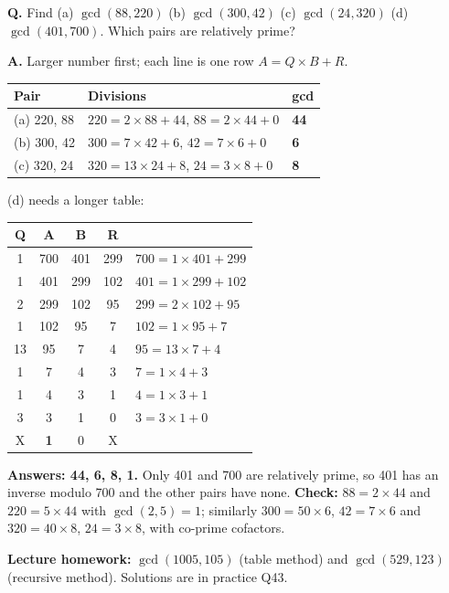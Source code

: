 \begin{worked}
\textbf{Q.} Find (a) $\gcd(88, 220)$ \quad (b) $\gcd(300, 42)$ \quad (c) $\gcd(24, 320)$ \quad (d) $\gcd(401, 700)$. Which pairs are relatively prime?

\textbf{A.} Larger number first; each line is one row $A = Q \times B + R$.
\begin{center}\small
\begin{tabular}{@{}lll@{}}
\toprule
Pair & Divisions & gcd\\
\midrule
(a) 220, 88 & $220 = 2 \times 88 + 44$, \;$88 = 2 \times 44 + 0$ & \textbf{44}\\
(b) 300, 42 & $300 = 7 \times 42 + 6$, \;$42 = 7 \times 6 + 0$ & \textbf{6}\\
(c) 320, 24 & $320 = 13 \times 24 + 8$, \;$24 = 3 \times 8 + 0$ & \textbf{8}\\
\bottomrule
\end{tabular}
\end{center}
(d) needs a longer table:
\begin{center}\small
\begin{tabular}{cccc|l}
\toprule
Q&A&B&R&\\
\midrule
1&700&401&299&$700 = 1 \times 401 + 299$\\
1&401&299&102&$401 = 1 \times 299 + 102$\\
2&299&102&95&$299 = 2 \times 102 + 95$\\
1&102&95&7&$102 = 1 \times 95 + 7$\\
13&95&7&4&$95 = 13 \times 7 + 4$\\
1&7&4&3&$7 = 1 \times 4 + 3$\\
1&4&3&1&$4 = 1 \times 3 + 1$\\
3&3&1&0&$3 = 3 \times 1 + 0$\\
X&\textbf{1}&0&X&\\
\bottomrule
\end{tabular}
\end{center}
\textbf{Answers: 44, 6, 8, 1.} Only 401 and 700 are relatively prime, so 401 has an inverse modulo 700 and the other pairs have none. \textbf{Check:} $88 = 2 \times 44$ and $220 = 5 \times 44$ with $\gcd(2, 5) = 1$; similarly $300 = 50 \times 6$, $42 = 7 \times 6$ and $320 = 40 \times 8$, $24 = 3 \times 8$, with co-prime cofactors.
\end{worked}

\textbf{Lecture homework:} $\gcd(1005, 105)$ (table method) and $\gcd(529, 123)$ (recursive method). Solutions are in practice Q43.

